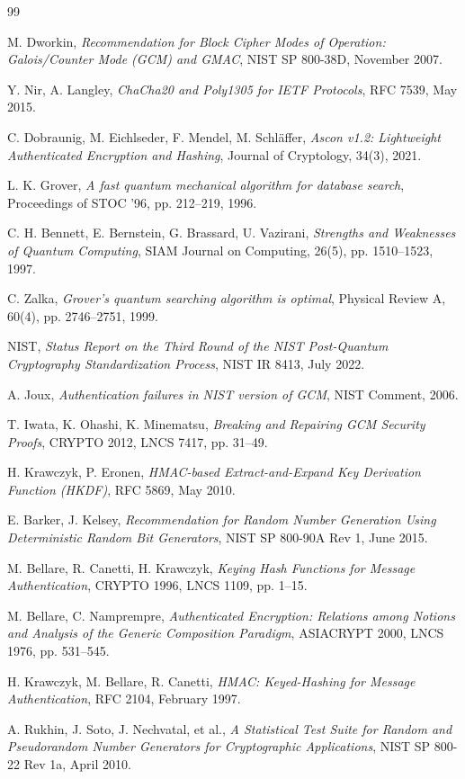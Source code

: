 \documentclass[11pt,a4paper]{article}
\begin{document}

\begin{thebibliography}{99}

  M. Dworkin,
  \emph{Recommendation for Block Cipher Modes of Operation: Galois/Counter Mode (GCM) and GMAC},
  NIST SP 800-38D, November 2007.

  Y. Nir, A. Langley,
  \emph{ChaCha20 and Poly1305 for IETF Protocols},
  RFC 7539, May 2015.

  C. Dobraunig, M. Eichlseder, F. Mendel, M. Schl\"{a}ffer,
  \emph{Ascon v1.2: Lightweight Authenticated Encryption and Hashing},
  Journal of Cryptology, 34(3), 2021.

  L. K. Grover,
  \emph{A fast quantum mechanical algorithm for database search},
  Proceedings of STOC '96, pp. 212--219, 1996.

  C. H. Bennett, E. Bernstein, G. Brassard, U. Vazirani,
  \emph{Strengths and Weaknesses of Quantum Computing},
  SIAM Journal on Computing, 26(5), pp. 1510--1523, 1997.

  C. Zalka,
  \emph{Grover's quantum searching algorithm is optimal},
  Physical Review A, 60(4), pp. 2746--2751, 1999.

  NIST,
  \emph{Status Report on the Third Round of the NIST Post-Quantum Cryptography Standardization Process},
  NIST IR 8413, July 2022.

  A. Joux,
  \emph{Authentication failures in NIST version of GCM},
  NIST Comment, 2006.

  T. Iwata, K. Ohashi, K. Minematsu,
  \emph{Breaking and Repairing GCM Security Proofs},
  CRYPTO 2012, LNCS 7417, pp. 31--49.

  H. Krawczyk, P. Eronen,
  \emph{HMAC-based Extract-and-Expand Key Derivation Function (HKDF)},
  RFC 5869, May 2010.

  E. Barker, J. Kelsey,
  \emph{Recommendation for Random Number Generation Using Deterministic Random Bit Generators},
  NIST SP 800-90A Rev 1, June 2015.

  M. Bellare, R. Canetti, H. Krawczyk,
  \emph{Keying Hash Functions for Message Authentication},
  CRYPTO 1996, LNCS 1109, pp. 1--15.

  M. Bellare, C. Namprempre,
  \emph{Authenticated Encryption: Relations among Notions and Analysis of the Generic Composition Paradigm},
  ASIACRYPT 2000, LNCS 1976, pp. 531--545.

  H. Krawczyk, M. Bellare, R. Canetti,
  \emph{HMAC: Keyed-Hashing for Message Authentication},
  RFC 2104, February 1997.

  A. Rukhin, J. Soto, J. Nechvatal, et al.,
  \emph{A Statistical Test Suite for Random and Pseudorandom Number Generators for Cryptographic Applications},
  NIST SP 800-22 Rev 1a, April 2010.

\end{thebibliography}
\end{document}
